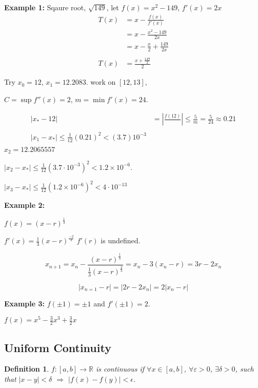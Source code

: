 \documentclass[12pt]{article}
\newcommand{\abs}[1]{\left| #1 \right|}
\theoremstyle{plain}
\newtheorem{definition}{Definition}[subsection]
\newcommand{\ep}{\varepsilon}
\begin{document}
	{\color{Brown}
	
	\textbf{Example 1: }
	Sqaure root, $\sqrt {149}$, let $f(x)=x^2-149$, $f'(x) = 2x$
	\begin{align*}
		T(x) 
		&= x-\frac{f(x)}{f'(x)} \\
		&= x-\frac{x^2-149}{2x} \\
		&= x-\frac x2 + \frac{149}{2x} \\\\
		T(x) &=\frac{x+\frac{149}2}2
	\end{align*}
		
	Try $x_0=12$, $x_1= 12.2083$. 	
	work on $[12, 13]$,

	$C = \sup f''(x) = 2$, $m = \min f'(x) = 24$. 

	\begin{align*}
		\abs{x_*-12} 
		&= \abs{\frac{f(12)}{}}\leq \frac 5m = \frac 5{24} \approx 0.21\\\\
		\abs{x_1-x_*}\leq \frac1{12}(0.21)^2< (3.7) 10^{-3}\\
	\end{align*}
	$x_2 = 12.2065557$

	$\abs{x_2-x_*} \leq 
	\frac1{12}(3.7\cdot 10^{-3})^2< 1.2\times 10^{-6}$.

	$\abs{x_3-x_*}\leq \frac1{12} (1.2\times 10^{-6})^2 < 4\cdot 10^{-13}$

	\textbf{Example 2: }

	$f(x) = (x-r)^{\frac13}$ 

	$f'(x) = \frac 13 (x-r)^{\frac{-2}3}$ $f'(r)$ is undefined.

	\[
		x_{n+1} = x_n-\frac{(x-r)^{\frac13}}{\frac 13 (x-r)^{\frac23}}
		= x_n-3 (x_n-r)=3r-2x_n
	\]

	\[
		\abs{x_{n=1}-r}=\abs{2r-2x_n} = 2\abs{x_n-r}
	\]

	\textbf{Example 3:}
	$f(\pm 1) = \pm1$ and $f'(\pm 1) = 2$. 

	$f(x) = x^5-\frac 32 x^3+\frac 32 x$
	}

	\newpage
	\subsection{Uniform Continuity}

	\begin{definition}
		$f: [a,b] \to \mathbb{R}$ is continuous if $\forall x \in [a,b]$, 
		$\forall \ep > 0$, $\exists \delta> 0$, such that $\abs{x-y} < \delta$
		$\Rightarrow$ $\abs{f(x)-f(y)} < \epsilon$. 
	\end{definition}
\end{document}
